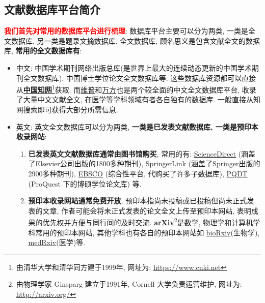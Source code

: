 \documentclass{formatBook}
\newcommand{\XG}[1]{\textcolor{red}{#1}}
\begin{document}
\subsection{文献数据库平台简介}
\XG{\textbf{我们首先对常用的数据库平台进行梳理}}: 数据库平台主要可以分为两类, 一类是全文数据库, 另一类是题录文摘数据库. 全文数据库, 顾名思义是包含文献全文的数据库, \textbf{常用的全文数据库有}:
\begin{itemize}
    \item 中文: 中国学术期刊网络出版总库(是世界上最大的连续动态更新的中国学术期刊全文数据库), 中国博士学位论文全文数据库等. 这些数据库资源都可以直接从\textbf{\href{https://www.cnki.net/}{中国知网}}\footnote{由清华大学和清华同方建于1999年, 网址为: \url{https://www.cnki.net}}获取. 而\href{http://www.cqvip.com/}{维普}和\href{https://new.wanfangdata.com.cn/index.html}{万方}也是两个较全面的中文全文数据库平台, 收录了大量中文文献全文, 在医学等学科领域有者各自独有的数据库. 一般直接从知网搜索即可获得大部分所需信息{.}
    \item 英文: 英文全文数据库可以分为两类, \textbf{一类是已发表文献数据库, 一类是预印本收录网站}:
          \begin{enumerate}
              \item \textbf{已发表英文文献数据库通常由图书馆购买}, 常用的有: \href{https://www.sciencedirect.com/}{ScienceDirect} (涵盖了Elsevier公司出版的1800多种期刊), \href{https://link.springer.com/}{SpringerLink} (涵盖了Springer出版的2900多种期刊), \href{https://www.ebsco.com}{EBSCO} (综合性平台, 代购买了许多子数据库), \href{http://www.pqdtcn.com/}{PQDT}
                    (ProQuest 下的博硕学位论文库) 等{.}
              \item \textbf{预印本收录网站通常免费开放}, 预印本指尚未投稿或已投稿但尚未正式发表的文章, 作者可能会将未正式发表的论文全文上传至预印本网站, 表明成果的优先权并方便与同行间的及时交流. \textbf{\href{http://arxiv.org/}{arXiv}}\footnote{由物理学家 Ginsparg 建立于1991年, Cornell 大学负责运营维护, 网址为: \url{http://arxiv.org/}}是数学, 物理学和计算机学科常用的预印本网站, 其他学科也有各自的预印本网站如 \href{https://www.biorxiv.org/}{bioRxiv}(生物学), \href{https://www.medrxiv.org/}{medRxiv}(医学)等.
          \end{enumerate}
\end{itemize}
\end{document}
